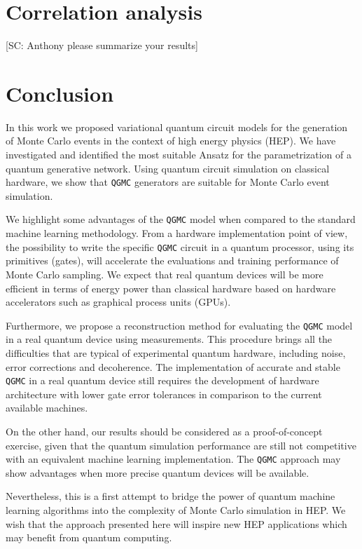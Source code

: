 \documentclass[twocolumn,preprintnumbers,superscriptaddress]{revtex4-2}
\begin{document}
\section{Correlation analysis}

{\color{red}[SC: Anthony please summarize your results]}

\section{Conclusion}
\label{sec:conclusion}

In this work we proposed variational quantum circuit models for the generation
of Monte Carlo events in the context of high energy physics (HEP). We have
investigated and identified the most suitable Ansatz for the parametrization of
a quantum generative network. Using quantum circuit simulation on classical
hardware, we show that {\tt QGMC} generators are suitable for Monte Carlo event
simulation.

We highlight some advantages of the {\tt QGMC} model when compared to the standard
machine learning methodology. From a hardware implementation point of view, the
possibility to write the specific {\tt QGMC} circuit in a quantum processor, using
its primitives (gates), will accelerate the evaluations and training performance
of Monte Carlo sampling. We expect that real quantum devices will be more
efficient in terms of energy power than classical hardware based on hardware
accelerators such as graphical process units (GPUs).

Furthermore, we propose a reconstruction method for evaluating the {\tt QGMC}
model in a real quantum device using measurements. This procedure brings all the
difficulties that are typical of experimental quantum hardware, including noise,
error corrections and decoherence. The implementation of accurate and stable
{\tt QGMC} in a real quantum device still requires the development of hardware
architecture with lower gate error tolerances in comparison to the current
available machines.

On the other hand, our results should be considered as a proof-of-concept
exercise, given that the quantum simulation performance are still not
competitive with an equivalent machine learning implementation. The {\tt QGMC}
approach may show advantages when more precise quantum devices will be
available.

Nevertheless, this is a first attempt to bridge the power of quantum machine
learning algorithms into the complexity of Monte Carlo simulation in HEP. We
wish that the approach presented here will inspire new HEP applications which
may benefit from quantum computing.
\end{document}
